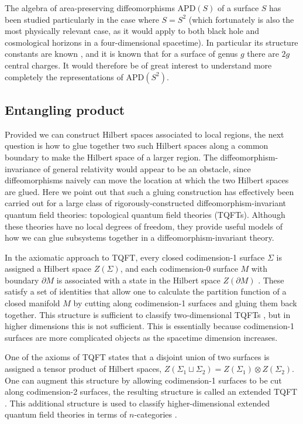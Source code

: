 \documentclass[a4paper,11pt]{article}
\begin{document}
The algebra of area-preserving diffeomorphisms $\text{APD}(S)$ of a surface $S$ has been studied particularly in the case where $S = S^2$ (which fortunately is also the most physically relevant case, as it would apply to both black hole and cosmological horizons in a four-dimensional spacetime).
In particular its structure constants are known \cite{deWit:1988ig}, and it is known that for a surface of genus $g$ there are $2g$ central charges.
It would therefore be of great interest to understand more completely the representations of $\text{APD}(S^2)$.

\subsection{Entangling product}

Provided we can construct Hilbert spaces associated to local regions, the next question is how to glue together two such Hilbert spaces along a common boundary to make the Hilbert space of a larger region.
The diffeomorphism-invariance of general relativity would appear to be an obstacle, since diffeomorphisms naively can move the location at which the two Hilbert spaces are glued.
Here we point out that such a gluing construction has effectively been carried out for a large class of rigorously-constructed diffeomorphism-invariant quantum field theories: topological quantum field theories (TQFTs).
Although these theories have no local degrees of freedom, they provide useful models of how we can glue subsystems together in a diffeomorphism-invariant theory.

In the axiomatic approach to TQFT, every closed codimension-1 surface $\Sigma$ is assigned a Hilbert space $Z(\Sigma)$, and each codimension-0 surface $M$ with boundary $\partial M$ is associated with a state in the Hilbert space $Z(\partial M)$ \cite{Atiyah1988}.
These satisfy a set of identities that allow one to calculate the partition function of a closed manifold $M$ by cutting along codimension-1 surfaces and gluing them back together.
This structure is sufficient to classify two-dimensional TQFTs \cite{SchommerPries:2011np}, but in higher dimensions this is not sufficient. 
This is essentially because codimension-1 surfaces are more complicated objects as the spacetime dimension increases.

One of the axioms of TQFT states that a disjoint union of two surfaces is assigned a tensor product of Hilbert spaces, $Z(\Sigma_1 \sqcup \Sigma_2) = Z(\Sigma_1) \otimes Z(\Sigma_2)$.
One can augment this structure by allowing codimension-1 surfaces to be cut along codimension-2 surfaces, the resulting structure is called an extended TQFT \cite{Baez1995}.
This additional structure is used to classify higher-dimensional extended quantum field theories in terms of $n$-categories \cite{Lurie2009}.
\end{document}
